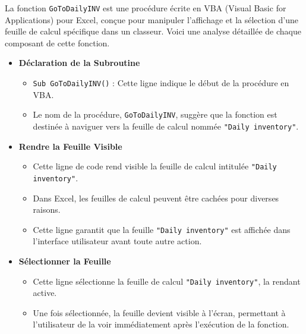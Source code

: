 \documentclass[a4paper, oneside, 12pt, final]{extreport}
\begin{document}
La fonction \texttt{GoToDailyINV} est une procédure écrite en VBA (Visual Basic for Applications) pour Excel, conçue pour manipuler l'affichage et la sélection d'une feuille de calcul spécifique dans un classeur. Voici une analyse détaillée de chaque composant de cette fonction.
\begin{itemize}

\item\textbf{Déclaration de la Subroutine}
\begin{itemize}
    \item \texttt{Sub GoToDailyINV()} : Cette ligne indique le début de la procédure en VBA.
    \item Le nom de la procédure, \texttt{GoToDailyINV}, suggère que la fonction est destinée à naviguer vers la feuille de calcul nommée \texttt{"Daily inventory"}.
\end{itemize}

\item\textbf{Rendre la Feuille Visible}
\begin{itemize}
    \item Cette ligne de code rend visible la feuille de calcul intitulée \texttt{"Daily inventory"}.
    \item Dans Excel, les feuilles de calcul peuvent être cachées pour diverses raisons.
    \item Cette ligne garantit que la feuille \texttt{"Daily inventory"} est affichée dans l'interface utilisateur avant toute autre action.
\end{itemize}

\item\textbf{Sélectionner la Feuille}
\begin{itemize}
    \item Cette ligne sélectionne la feuille de calcul \texttt{"Daily inventory"}, la rendant active.
    \item Une fois sélectionnée, la feuille devient visible à l'écran, permettant à l'utilisateur de la voir immédiatement après l'exécution de la fonction.
\end{itemize}
\end{itemize}
\end{document}
